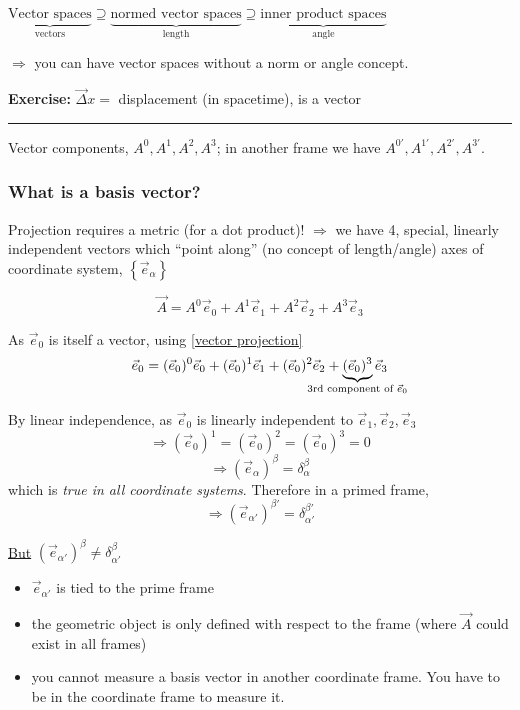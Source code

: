 \documentclass[a4paper]{article} %
\newcommand{\exercise}[2]
{
\begin{framed}
\textbf{Exercise:} #1 \\\hrule
#2
\end{framed}
}
\begin{document}
$\underbrace{\text{Vector spaces}}_{\text{vectors}}\supseteq \underbrace{\text{normed vector spaces}}_{\text{length}} \supseteq \underbrace{\text{inner product spaces}}_{\text{angle}}$

$\Rightarrow$ you can have vector spaces without a norm or angle concept.

\exercise{$\vec{\Delta}x=$ displacement (in spacetime), is a vector}{}

Vector components, $A^0,A^1,A^2,A^3$; in another frame we have $A^{0'},A^{1'},A^{2'},A^{3'}$.

\subsubsection{What is a basis vector?}
Projection requires a metric (for a dot product)!
$\Rightarrow$ we have 4, special, linearly independent vectors which ``point along'' (no concept of length/angle) axes of coordinate system, $\left\{\vec{e}_{\alpha}\right\}$

\begin{equation}
\vec{A}=A^0 \vec{e}_{0} +A^{1}\vec{e}_{1}+A^{2}\vec{e}_{2}+A^{3}\vec{e}_{3} \label{vector projection}
\end{equation}

As $\vec{e}_{0}$ is itself a vector, using \ref{vector projection}
\begin{equation}
\vec{e}_{0}=(\vec{e}_{0})^{0}\vec{e}_{0}+(\vec{e}_{0})^{1}\vec{e}_{1}+(\vec{e}_{0})^{2}\vec{e}_{2}
+\underbrace{(\vec{e}_{0})^{3}}_{\mathclap{\text{3rd component of }\vec{e}_{0}}}\vec{e}_{3}
\end{equation}

By linear independence, as $\vec{e}_0$ is linearly independent to $\vec{e}_{1},\vec{e}_{2},\vec{e}_{3}$
\begin{equation}
\Rightarrow (\vec{e}_{0})^{1}=(\vec{e}_{0})^{2}=(\vec{e}_{0})^{3}=0
\end{equation}
\begin{equation}
\Rightarrow (\vec{e}_{\alpha})^{\beta}=\delta_{\alpha}^{\beta}
\end{equation}
which is \emph{true in all coordinate systems}. Therefore in a primed frame,
\begin{equation}
\Rightarrow (\vec{e}_{\alpha'})^{\beta'}=\delta_{\alpha'}^{\beta'}
\end{equation}

\underline{But} $(\vec{e}_{\alpha'})^{\beta}\neq \delta^{\beta}_{\alpha'}$
\begin{itemize}
\item $\vec{e}_{\alpha'}$ is tied to the prime frame
\item the geometric object is only defined with respect to the frame (where $\vec{A}$ could exist in all frames)
\item you cannot measure a basis vector in another coordinate frame. You have to be in the coordinate frame to measure it.
\end{itemize}
\end{document}
